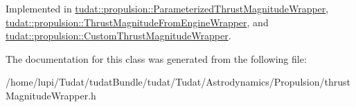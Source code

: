 Implemented in \hyperlink{classtudat_1_1propulsion_1_1ParameterizedThrustMagnitudeWrapper_a9986324434fea86a4e9b54d86e0200b3}{tudat\+::propulsion\+::\+Parameterized\+Thrust\+Magnitude\+Wrapper}, \hyperlink{classtudat_1_1propulsion_1_1ThrustMagnitudeFromEngineWrapper_a54420ac820119f526d5f33d7d6380fb7}{tudat\+::propulsion\+::\+Thrust\+Magnitude\+From\+Engine\+Wrapper}, and \hyperlink{classtudat_1_1propulsion_1_1CustomThrustMagnitudeWrapper_ad018abccc9285d40a5776f706fd675a0}{tudat\+::propulsion\+::\+Custom\+Thrust\+Magnitude\+Wrapper}.



The documentation for this class was generated from the following file\+:\begin{DoxyCompactItemize}
\item 
/home/lupi/\+Tudat/tudat\+Bundle/tudat/\+Tudat/\+Astrodynamics/\+Propulsion/thrust\+Magnitude\+Wrapper.\+h\end{DoxyCompactItemize}
